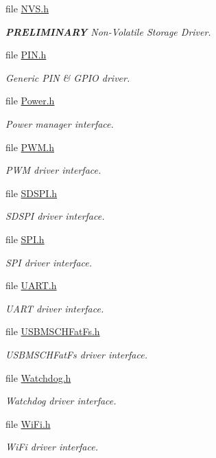 \begin{DoxyCompactItemize}
file \hyperlink{_n_v_s_8h}{N\+V\+S.\+h}
\begin{DoxyCompactList}\small\item\em {\bfseries P\+R\+E\+L\+I\+M\+I\+N\+A\+R\+Y} Non-\/\+Volatile Storage Driver. \end{DoxyCompactList}\item 
file \hyperlink{_p_i_n_8h}{P\+I\+N.\+h}
\begin{DoxyCompactList}\small\item\em Generic P\+I\+N \& G\+P\+I\+O driver. \end{DoxyCompactList}\item 
file \hyperlink{_power_8h}{Power.\+h}
\begin{DoxyCompactList}\small\item\em Power manager interface. \end{DoxyCompactList}\item 
file \hyperlink{_p_w_m_8h}{P\+W\+M.\+h}
\begin{DoxyCompactList}\small\item\em P\+W\+M driver interface. \end{DoxyCompactList}\item 
file \hyperlink{_s_d_s_p_i_8h}{S\+D\+S\+P\+I.\+h}
\begin{DoxyCompactList}\small\item\em S\+D\+S\+P\+I driver interface. \end{DoxyCompactList}\item 
file \hyperlink{_s_p_i_8h}{S\+P\+I.\+h}
\begin{DoxyCompactList}\small\item\em S\+P\+I driver interface. \end{DoxyCompactList}\item 
file \hyperlink{_u_a_r_t_8h}{U\+A\+R\+T.\+h}
\begin{DoxyCompactList}\small\item\em U\+A\+R\+T driver interface. \end{DoxyCompactList}\item 
file \hyperlink{_u_s_b_m_s_c_h_fat_fs_8h}{U\+S\+B\+M\+S\+C\+H\+Fat\+Fs.\+h}
\begin{DoxyCompactList}\small\item\em U\+S\+B\+M\+S\+C\+H\+Fat\+Fs driver interface. \end{DoxyCompactList}\item 
file \hyperlink{_watchdog_8h}{Watchdog.\+h}
\begin{DoxyCompactList}\small\item\em Watchdog driver interface. \end{DoxyCompactList}\item 
file \hyperlink{_wi_fi_8h}{Wi\+Fi.\+h}
\begin{DoxyCompactList}\small\item\em Wi\+Fi driver interface. \end{DoxyCompactList}\end{DoxyCompactItemize}
